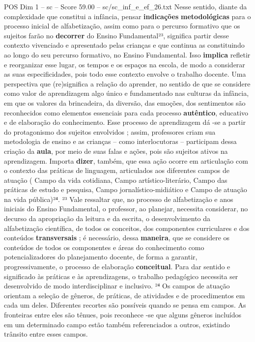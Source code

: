 \begin{textsample}{POS Dim 1 – sc – Score 59.00 – sc/sc\_inf\_e\_ef\_26.txt}
Nesse sentido, diante da complexidade que constitui a infância, pensar \textbf{indicações} \textbf{metodológicas} para o processo inicial de alfabetização, assim como para o percurso formativo que os sujeitos farão no \textbf{decorrer} do Ensino Fundamental²³, significa partir desse contexto vivenciado e apresentado pelas crianças e que continua as constituindo ao longo do seu percurso formativo, no Ensino Fundamental.
Isso \textbf{implica} refletir e reorganizar esse lugar, os tempos e os espaços na escola, de modo a considerar as suas especificidades, pois todo esse contexto envolve o trabalho docente.
Uma perspectiva que (re)significa a relação do aprender, no sentido de que se considere como valor de aprendizagem algo único e fundamentado nas culturas da infância, em que os valores da brincadeira, da diversão, das emoções, dos sentimentos são reconhecidos como elementos essenciais para cada processo \textbf{autêntico}, educativo e de elaboração do conhecimento.
Esse processo de aprendizagem dá -se a partir do protagonismo dos sujeitos envolvidos ; assim, professores criam sua metodologia de ensino e as crianças – como interlocutoras – participam dessa criação da \textbf{aula}, por meio de suas falas e ações, pois são sujeitos ativos na aprendizagem.
Importa \textbf{dizer}, também, que essa ação ocorre em articulação com o contexto das práticas de linguagem, articulados aos diferentes campos de atuação ( Campo da vida cotidiana, Campo artístico-literário, Campo das práticas de estudo e pesquisa, Campo jornalístico-midiático e Campo de atuação na vida pública)²⁴. ²³ Vale ressaltar que, no processo de alfabetização e anos iniciais do Ensino Fundamental, o professor, ao planejar, necessita considerar, no decurso da apropriação da leitura e da escrita, o desenvolvimento da alfabetização científica, de todos os conceitos, dos componentes curriculares e dos conteúdos \textbf{transversais} ; é necessário, dessa \textbf{maneira}, que se considere os conteúdos de todos os componentes e áreas do conhecimento como potencializadores do planejamento docente, de forma a garantir, progressivamente, o processo de elaboração \textbf{conceitual}.
Para dar sentido e significado às práticas e às aprendizagens, o trabalho pedagógico necessita ser desenvolvido de modo interdisciplinar e inclusivo. ²⁴ Os campos de atuação orientam a seleção de gêneros, de práticas, de atividades e de procedimentos em cada um deles.
Diferentes recortes são possíveis quando se pensa em campos.
As fronteiras entre eles são tênues, pois reconhece -se que alguns gêneros incluídos em um determinado campo estão também referenciados a outros, existindo trânsito entre esses campos.

\end{textsample}
